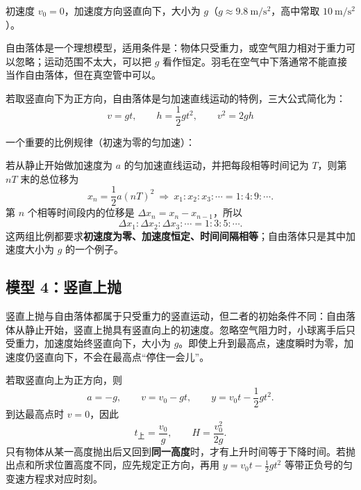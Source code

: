 初速度 $v_0 = 0$，加速度方向竖直向下，大小为 $g$（$g \approx 9.8\ \mathrm{m/s^2}$，高中常取 $10\ \mathrm{m/s^2}$）。

自由落体是一个理想模型，适用条件是：物体只受重力，或空气阻力相对于重力可以忽略；运动范围不太大，可以把 $g$ 看作恒定。羽毛在空气中下落通常不能直接当作自由落体，但在真空管中可以。

若取竖直向下为正方向，自由落体是匀加速直线运动的特例，三大公式简化为：
\[
v = gt,\qquad h = \frac12 gt^2,\qquad v^2 = 2gh
\]

一个重要的比例规律（初速为零的匀加速）：
\begin{center}


\label{fig:freefall-proportion}
\end{center}

若从静止开始做加速度为 $a$ 的匀加速直线运动，并把每段相等时间记为 $T$，则第 $nT$ 末的总位移为
\[
x_n=\frac12a(nT)^2\ \Longrightarrow\ x_1:x_2:x_3:\cdots=1:4:9:\cdots .
\]
第 $n$ 个相等时间段内的位移是 $\Delta x_n=x_n-x_{n-1}$，所以
\[
\Delta x_1:\Delta x_2:\Delta x_3:\cdots=1:3:5:\cdots .
\]
这两组比例都要求\textbf{初速度为零、加速度恒定、时间间隔相等}；自由落体只是其中加速度大小为 $g$ 的一个例子。

\subsection*{模型 4：竖直上抛}

竖直上抛与自由落体都属于只受重力的竖直运动，但二者的初始条件不同：自由落体从静止开始，竖直上抛具有竖直向上的初速度。忽略空气阻力时，小球离手后只受重力，加速度始终竖直向下，大小为 $g$。即使上升到最高点，速度瞬时为零，加速度仍竖直向下，不会在最高点“停住一会儿”。

\begin{center}


\label{fig:vertical-throw-motion}
\end{center}

若取竖直向上为正方向，则
\[
a=-g,\qquad
v=v_0-gt,\qquad
y=v_0t-\frac12gt^2.
\]
到达最高点时 $v=0$，因此
\[
t_{\text{上}}=\frac{v_0}{g},\qquad
H=\frac{v_0^2}{2g}.
\]
只有物体从某一高度抛出后又回到\textbf{同一高度}时，才有上升时间等于下降时间。若抛出点和所求位置高度不同，应先规定正方向，再用 $y=v_0t-\frac12gt^2$ 等带正负号的匀变速方程求对应时刻。

